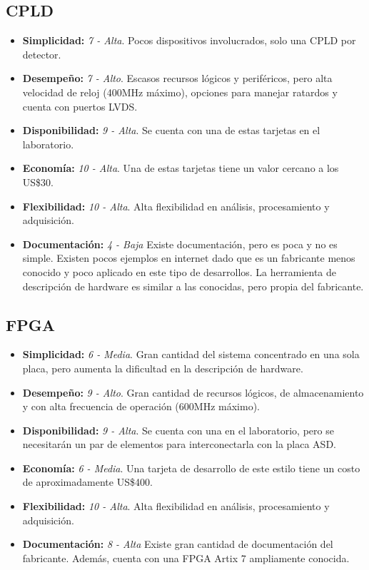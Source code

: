 \newpage
\subsection{CPLD}
\begin{itemize}
	\item \textbf{Simplicidad:} \textit{7 - Alta}. Pocos dispositivos involucrados, solo una CPLD por detector.
	\item \textbf{Desempeño:}  \textit{7 - Alto}. Escasos recursos lógicos y periféricos, pero alta velocidad de reloj (400MHz máximo), opciones para manejar ratardos y cuenta con puertos LVDS.
	\item \textbf{Disponibilidad:} \textit{9 - Alta}. Se cuenta con una de estas tarjetas en el laboratorio.
	\item \textbf{Economía: } \textit{10 - Alta}. Una de estas tarjetas tiene un valor cercano a los US\$30.
	\item \textbf{Flexibilidad:} \textit{10 - Alta}. Alta flexibilidad en análisis, procesamiento y adquisición.
	\item \textbf{Documentación:} \textit{4 - Baja} Existe documentación, pero es poca y no es simple. Existen pocos ejemplos en internet dado que es un fabricante menos conocido y poco aplicado en este tipo de desarrollos. La herramienta de descripción de hardware es similar a las conocidas, pero propia del fabricante.
\end{itemize}


\subsection{FPGA}
\begin{itemize}
	\item \textbf{Simplicidad:}  \textit{6 - Media}. Gran cantidad del sistema concentrado en una sola placa, pero aumenta la dificultad en la descripción de hardware.
	\item \textbf{Desempeño:}  \textit{9 - Alto}. Gran cantidad de recursos lógicos, de almacenamiento y con alta  frecuencia de operación (600MHz máximo).
	\item \textbf{Disponibilidad: } \textit{9 - Alta}. Se cuenta con una en el laboratorio, pero se necesitarán un par de elementos para interconectarla con la placa ASD.
	\item \textbf{Economía: }\textit{6 - Media}. Una tarjeta de desarrollo de este estilo tiene un costo de aproximadamente US\$400.
	\item \textbf{Flexibilidad:} \textit{10 - Alta}. Alta flexibilidad en análisis, procesamiento y adquisición.
	\item \textbf{Documentación:} \textit{8 - Alta} Existe gran cantidad de documentación del fabricante. Además, cuenta con una FPGA Artix 7 ampliamente conocida.
\end{itemize}

